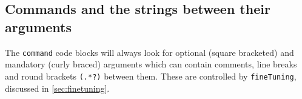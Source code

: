\subsection{Commands and the strings between their arguments}\label{subsec:commands-string-between} The \texttt{command} code blocks will
 always look for optional (square bracketed) and mandatory (curly braced) arguments which
 can contain comments, line breaks and round brackets \lstinline!(.*?)! between them.
 These are controlled by \texttt{fineTuning}, discussed in \vref{sec:finetuning}.
